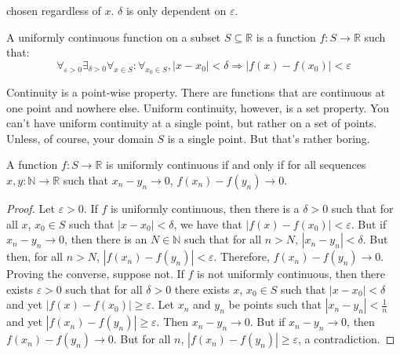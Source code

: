             chosen regardless of $x$. $\delta$ is
            only dependent on $\varepsilon$.
            \begin{definition}
                A uniformly continuous function on a subset
                $S\subseteq\mathbb{R}$
                is a function $f:S\rightarrow\mathbb{R}$ such that:
                \begin{equation*}
                    \forall_{\varepsilon>0}\exists_{\delta>0}
                    \forall_{x\in{S}}:\forall_{x_{0}\in{S}},
                    |x-x_{0}|<\delta
                    \Rightarrow|f(x)-f(x_{0})|<\varepsilon    
                \end{equation*}
            \end{definition}
            Continuity is a point-wise property. There are
            functions that are continuous at one point
            and nowhere else. Uniform continuity, however,
            is a set property. You can't have uniform
            continuity at a single point,
            but rather on a set of points. Unless, of course,
            your domain $S$ is a single point. But that's rather boring.
            \begin{theorem}
                \label{thm:Funct:equiv_def_of_uni_cont}
                A function $f:S\rightarrow\mathbb{R}$
                is uniformly continuous if and only if
                for all sequences $x,y:\mathbb{N}\rightarrow\mathbb{R}$
                such that $x_{n}-y_{n}\rightarrow{0}$,
                $f(x_{n})-f(y_{n})\rightarrow{0}$.
            \end{theorem}
            \begin{proof}
                Let $\varepsilon>0$. If $f$ is uniformly continuous,
                then there is a $\delta>0$ such that for all
                $x$, $x_{0}\in{S}$ such that $|x-x_{0}|<\delta$,
                we have that $|f(x)-f(x_{0})|<\varepsilon$. But if
                $x_{n}-y_{n}\rightarrow{0}$, then there is an
                $N\in\mathbb{N}$ such that for all $n>N$,
                $|x_{n}-y_{n}|<\delta$. But then, for all $n>N$,
                $|f(x_{n})-f(y_{n})|<\varepsilon$. Therefore,
                $f(x_{n})-f(y_{n})\rightarrow{0}$. Proving the
                converse, suppose not. If $f$ is not uniformly
                continuous, then there exists $\varepsilon>0$
                such that for all $\delta>0$ there exists
                $x$, $x_{0}\in{S}$ such that
                $|x-x_{0}|<\delta$ and yet
                $|f(x)-f(x_{0})|\geq{\varepsilon}$. Let
                $x_{n}$ and $y_{n}$ be points such that
                $|x_{n}-y_{n}|<\frac{1}{n}$ and yet
                $|f(x_{n})-f(y_{n})|\geq\varepsilon$. Then
                $x_{n}-y_{n}\rightarrow{0}$. But if
                $x_{n}-y_{n}\rightarrow{0}$, then
                $f(x_{n})-f(y_{n})\rightarrow{0}$. But for all
                $n$, $|f(x_{n})-f(y_{n})|\geq{\varepsilon}$,
                a contradiction.
            \end{proof}
